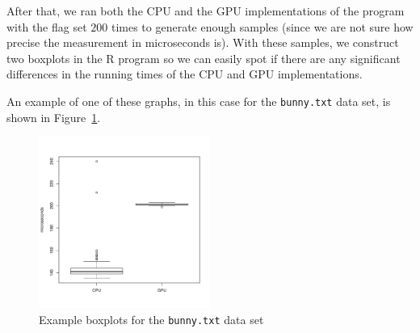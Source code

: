 After that, we ran both the CPU and the GPU implementations of the program with the flag set $200$ times to generate enough samples (since we are not sure how precise the measurement in microseconds is).
With these samples, we construct two boxplots in the R program so we can easily spot if there are any significant differences in the running times of the CPU and GPU implementations.

An example of one of these graphs, in this case for the \texttt{bunny.txt} data set, is shown in Figure~\ref{fig:bunny_box}.

\begin{figure}
	\center
	\includegraphics[width=0.5\textwidth]{results/bunny.pdf}
	\caption{Example boxplots for the \texttt{bunny.txt} data set}
	\label{fig:bunny_box}
\end{figure}

